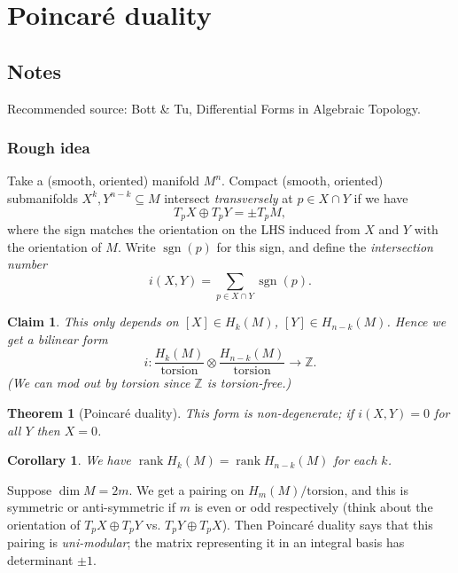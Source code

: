\documentclass[a4paper]{article}
\newtheorem*{theorem}{Theorem}
\newtheorem*{corollary}{Corollary}
\newtheorem*{claim}{Claim}
\theoremstyle{definition}
\theoremstyle{remark}
\DeclareMathOperator{\sgn}{sgn}
\DeclareMathOperator{\rank}{rank}
\newcommand{\Z}{\mathbb{Z}}
\begin{document}
\section{Poincar\'e duality}

\subsection*{Notes}

Recommended source: Bott \& Tu, Differential Forms in Algebraic Topology.

\subsubsection*{Rough idea}

Take a (smooth, oriented) manifold $M^n$. Compact (smooth, oriented) submanifolds
$X^k,Y^{n-k}\subseteq M$ intersect \emph{transversely} at $p\in X\cap Y$ if we
have
\begin{equation*}
    T_pX\oplus T_pY = \pm T_pM,
\end{equation*}
where the sign matches the orientation on the LHS induced from $X$ and $Y$ with
the orientation of $M$. Write $\sgn(p)$ for this sign, and define the
\emph{intersection number}
\begin{equation*}
    i(X,Y) = \sum_{p\in X\cap Y}\sgn(p).
\end{equation*}

\begin{claim}
    This only depends on $[X]\in H_k(M)$, $[Y]\in H_{n-k}(M)$. Hence we get a
    bilinear form
    \begin{equation*}
        i:\frac{H_k(M)}{\text{torsion}}
            \otimes\frac{H_{n-k}(M)}{\text{torsion}}\to\Z.
    \end{equation*}
    (We can mod out by torsion since $\Z$ is torsion-free.)
\end{claim}

\begin{theorem}[Poincar\'e duality]
    This form is non-degenerate; if $i(X,Y)=0$ for all $Y$ then $X=0$.
\end{theorem}

\begin{corollary}
    We have $\rank H_k(M)=\rank H_{n-k}(M)$ for each $k$.
\end{corollary}

Suppose $\dim M=2m$. We get a pairing on $H_m(M)/\text{torsion}$, and this is
symmetric or anti-symmetric if $m$ is even or odd respectively (think about the
orientation of $T_pX\oplus T_pY$ vs. $T_pY\oplus T_pX$). Then Poincar\'e duality
says that this pairing is \emph{uni-modular}; the matrix representing it in an
integral basis has determinant $\pm1$.
\end{document}
